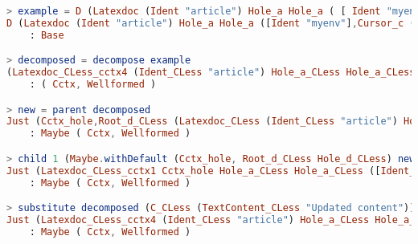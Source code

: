 \begin{lstlisting}[style=inline, language=elm, caption={Editing sessions with the \LaTeX \ editor in the Elm REPl}, label={lst:latex-repl}]
> example = D (Latexdoc (Ident "article") Hole_a Hole_a ( [ Ident "myenv" ], Cursor_c (TextContent "Hello World!") ))
D (Latexdoc (Ident "article") Hole_a Hole_a ([Ident "myenv"],Cursor_c (TextContent ("Hello World!"))))
    : Base

> decomposed = decompose example
(Latexdoc_CLess_cctx4 (Ident_CLess "article") Hole_a_CLess Hole_a_CLess ([Ident_CLess "myenv"],Cctx_hole),Root_c_CLess (TextContent_CLess ("Hello World!")))
    : ( Cctx, Wellformed )

> new = parent decomposed
Just (Cctx_hole,Root_d_CLess (Latexdoc_CLess (Ident_CLess "article") Hole_a_CLess Hole_a_CLess ([Ident_CLess "myenv"],TextContent_CLess ("Hello World!"))))
    : Maybe ( Cctx, Wellformed )

> child 1 (Maybe.withDefault (Cctx_hole, Root_d_CLess Hole_d_CLess) new)
Just (Latexdoc_CLess_cctx1 Cctx_hole Hole_a_CLess Hole_a_CLess ([Ident_CLess "myenv"],TextContent_CLess ("Hello World!")),Root_id_CLess (Ident_CLess "article"))
    : Maybe ( Cctx, Wellformed )

> substitute decomposed (C_CLess (TextContent_CLess "Updated content"))
Just (Latexdoc_CLess_cctx4 (Ident_CLess "article") Hole_a_CLess Hole_a_CLess ([Ident_CLess "myenv"],Cctx_hole),Root_c_CLess (TextContent_CLess ("Updated content")))
    : Maybe ( Cctx, Wellformed )
\end{lstlisting}